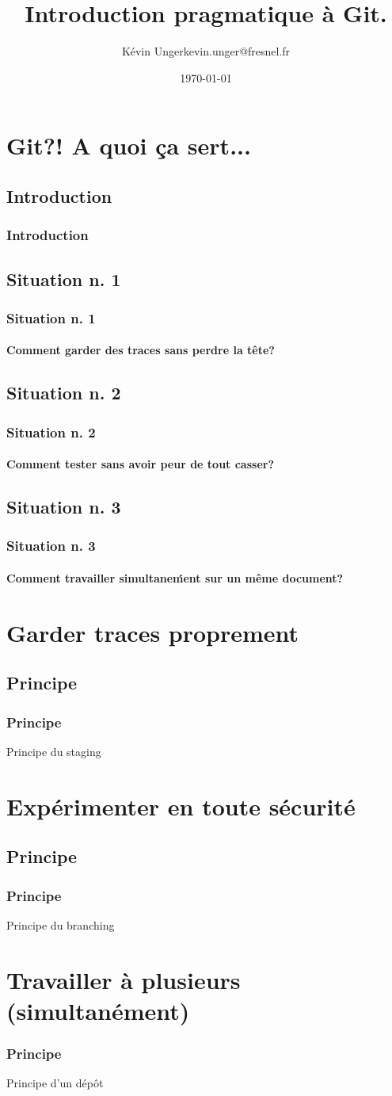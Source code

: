 \documentclass[t]{beamer}
\author{Kévin Unger\newline kevin.unger@fresnel.fr}
\date{\today}
\title{Introduction pragmatique à Git.}
\begin{document}
\section{Git?! A quoi ça sert...}
\subsection{Introduction}
\frame{\titlepage}
\begin{frame}[label=intro]
        \frametitle{Introduction}
\end{frame}


\subsection{Situation n. 1}
\begin{frame}[label=sit1]
        \frametitle{Situation n. 1}
        \framesubtitle{Comment garder des traces sans perdre la tête?}
\end{frame}


\subsection{Situation n. 2}
\begin{frame}[label=sit2]
        \frametitle{Situation n. 2}
        \framesubtitle{Comment tester sans avoir peur de tout casser?}
\end{frame}


\subsection{Situation n. 3}
\begin{frame}[label=sit3]
        \frametitle{Situation n. 3}
        \framesubtitle{Comment travailler simultane\'ment sur un même document?}
\end{frame}

\section{Garder traces proprement}
\subsection{Principe}
\begin{frame}
        \frametitle{Principe}
        Principe du staging
\end{frame}

\section{Exp\'erimenter en toute s\'ecurit\'e}
\subsection{Principe}
\begin{frame}
        \frametitle{Principe}
        Principe du branching
\end{frame}

\section{Travailler \`a plusieurs (simultan\'ement) }
\begin{frame}
        \frametitle{Principe}
        Principe d'un d\'ep\^ot
\end{frame}
\end{document}
